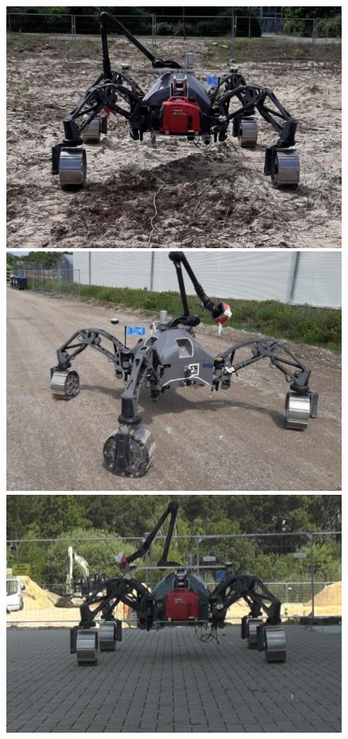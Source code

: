 \begin{figure}[!h]
	\begin{minipage}[t]{0.3\linewidth} 
		\centering 
		\includegraphics[width=\textwidth]{../figures/unprepsand.png} 
	\end{minipage} 
	\quad 
	\begin{minipage}[t]{0.3\linewidth} 
		\centering 
		\includegraphics[width=\textwidth]{../figures/compact.png} 
	\end{minipage}
	\quad 
    \begin{minipage}[t]{0.3\linewidth} 
		\centering 
		\includegraphics[width=\textwidth]{../figures/concrete.png} 

\end{minipage}
\end{figure}
